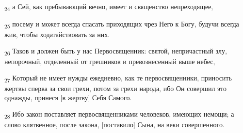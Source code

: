 \begin{tcolorbox}
\textsubscript{24} а Сей, как пребывающий вечно, имеет и священство непреходящее,
\end{tcolorbox}
\begin{tcolorbox}
\textsubscript{25} посему и может всегда спасать приходящих чрез Него к Богу, будучи всегда жив, чтобы ходатайствовать за них.
\end{tcolorbox}
\begin{tcolorbox}
\textsubscript{26} Таков и должен быть у нас Первосвященник: святой, непричастный злу, непорочный, отделенный от грешников и превознесенный выше небес,
\end{tcolorbox}
\begin{tcolorbox}
\textsubscript{27} Который не имеет нужды ежедневно, как те первосвященники, приносить жертвы сперва за свои грехи, потом за грехи народа, ибо Он совершил это однажды, принеся [в жертву] Себя Самого.
\end{tcolorbox}
\begin{tcolorbox}
\textsubscript{28} Ибо закон поставляет первосвященниками человеков, имеющих немощи; а слово клятвенное, после закона, [поставило] Сына, на веки совершенного.
\end{tcolorbox}
